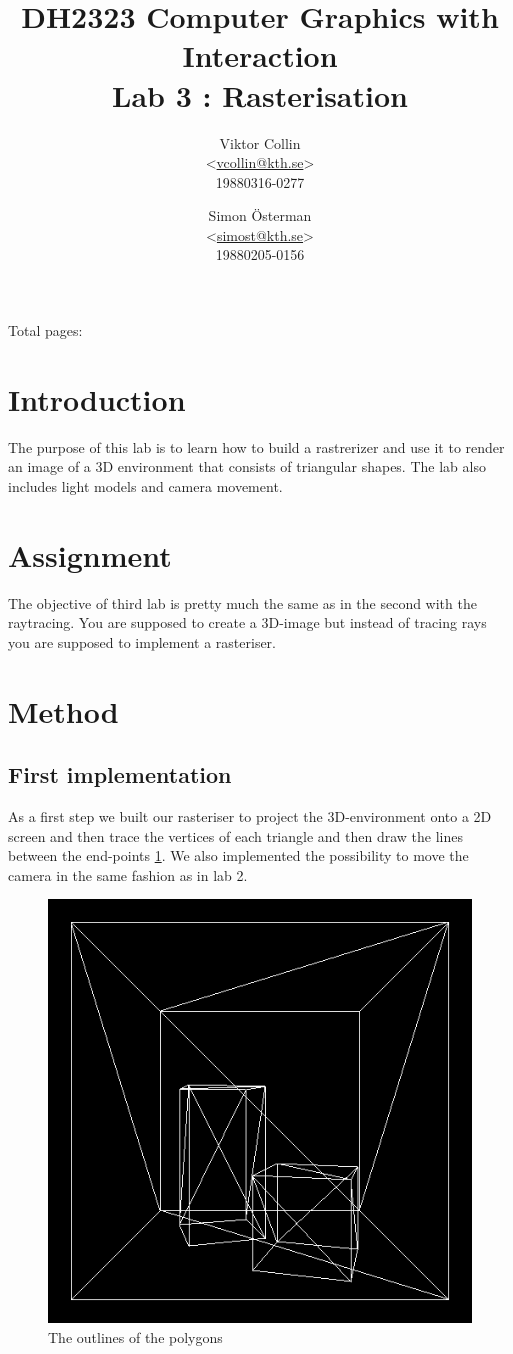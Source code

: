 \documentclass[a4paper,11pt]{article}
\author{Viktor Collin \\ <\url{vcollin@kth.se}> \\ 19880316-0277 \and Simon \"{O}sterman \\ <\url{simost@kth.se}> \\ 19880205-0156}
\title{\textbf{DH2323 Computer Graphics with Interaction \\ Lab 3 : Rasterisation}}
\begin{document}
\maketitle
\begin{center}
Total pages: \pageref{LastPage}
\end{center}
\thispagestyle{empty}

\clearpage
\setcounter{page}{1}
\section{Introduction}
The purpose of this lab is to learn how to build a rastrerizer and use it to render an image of a 3D environment that consists of triangular shapes. The lab also includes light models and camera movement. 
\section{Assignment}
The objective of third lab is pretty much the same as in the second with the raytracing. You are supposed to create a 3D-image but instead of tracing rays you are supposed to implement a rasteriser.
\section{Method}
\subsection{First implementation}
As a first step we built our rasteriser to project the 3D-environment onto a 2D screen and then trace the vertices of each triangle and then draw the lines between the end-points \ref{fig1}. We also implemented the possibility to move the camera in the same fashion as in lab 2. 

\begin{figure}[h!]
	\centering	
	\includegraphics[width=0.4\linewidth]{screenshot1.png}
	\caption{The outlines of the polygons}
	\label{fig1}
\end{figure}
\clearpage
\end{document}
